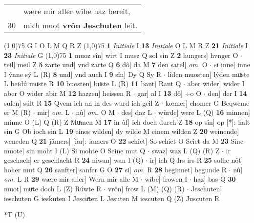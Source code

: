 \documentclass[8pt,a4paper,notitlepage]{article}
\begin{document}
\begin{table}[ht]
\begin{minipage}[t]{0.5\linewidth}
\begin{tabular}{rl}
 & wære mir aller wîbe haz bereit,\\ 
30 & mich muot \textbf{vrôn Jeschuten} leit.\\ 
\end{tabular}
\scriptsize
\line(1,0){75} \newline
G I O L M Q R Z \newline
\line(1,0){75} \newline
\textbf{1} \textit{Initiale} I  \textbf{13} \textit{Initiale} O L M R Z  \textbf{21} \textit{Initiale} I  \textbf{23} \textit{Initiale} G  \newline
\line(1,0){75} \newline
\textbf{1} muoz sîn] wirt I musz Q sol sin Z \textbf{2} hungers] hvnger O  $\cdot$ teil] meil Z \textbf{5} zarte und] vnd zarte Q \textbf{6} dô] da M \textbf{7} den satel] \textit{om.} O  $\cdot$ si inne] inne I ýnne sý L (R) \textbf{8} und] vnd auch I \textbf{9} sîn] Dy Q Sy R  $\cdot$ lîden muosten] lýden muͯste L beidú muͦste R \textbf{10} buosten] buͯste L (R) \textbf{11} bant] Rant Q  $\cdot$ aber wider] wider I aber O wider abir M \textbf{12} hazzen] heissen R  $\cdot$ gar] al I \textbf{13} dô] ÷o O  $\cdot$ den] der I \textbf{14} sulen] súlt R \textbf{15} Qvem ich an in des wurd ich geil Z  $\cdot$ kœmer] chomer G Beqweme er M (R)  $\cdot$ mir] \textit{om.} L  $\cdot$ nû] \textit{om.} O M  $\cdot$ des] daz L  $\cdot$ würde] were L (Q) \textbf{16} minnen] minne O (L) Q (R) Z Muͯmen M \textbf{17} in ûf] ich doch durch Z \textbf{18} op sîn] op [*]: halt sin G Ob ioch sin L \textbf{19} eines wilden] dy wilde M einem wilden Z \textbf{20} weinende] weneden Q \textbf{21} jâmers] [iar]: iamers O \textbf{22} schiet] So schiet O Sciet da M \textbf{23} Sine muote] sin moht I (L) Si mohte O Seine mut Q  $\cdot$ swaz] waz L (Q) (R) Z  $\cdot$ ir geschach] er geschlacht R \textbf{24} niwan] wan I (Q)  $\cdot$ ir] ich Q Irs irs R \textbf{25} solhe nôt] hoher mut Q \textbf{26} sanfter] sanfer G O \textbf{27} si] \textit{om.} R \textbf{28} beginnet] begunde R  $\cdot$ nû] \textit{om.} L R \textbf{29} wære mir aller] Wern mir alle M  $\cdot$ wîbe] frowen I  $\cdot$ haz] bas Q \textbf{30} muot] muͯte doch L (Z) Rúwte R  $\cdot$ vrôn] frow L (M) (Q) (R)  $\cdot$ Jeschuten] ieschuten G ieskuten I Jescuͯten L Jesuten M iescuten Q (Z) Juscuten R \newline
\end{minipage}
\hspace{0.5cm}
\begin{minipage}[t]{0.5\linewidth}
\small
\begin{center}*T (U)

\end{center}
\end{minipage}
\end{table}
\end{document}
